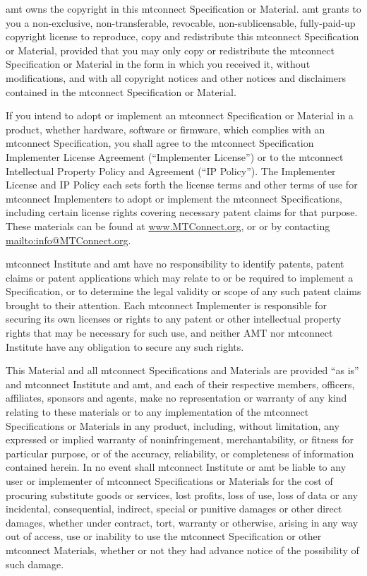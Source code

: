\gls{amt} owns the copyright in this \gls{mtconnect} Specification or Material. \gls{amt} grants to you a non-exclusive, non-transferable, revocable, non-sublicensable, fully-paid-up copyright license to reproduce, copy and redistribute this \gls{mtconnect} Specification or Material, provided that you may only copy or redistribute the \gls{mtconnect} Specification or Material in the form in which you received it, without modifications, and with all copyright notices and other notices and disclaimers contained in the \gls{mtconnect} Specification or Material.

If you intend to adopt or implement an \gls{mtconnect} Specification or Material in a product, whether hardware, software or firmware, which complies with an \gls{mtconnect} Specification, you shall agree to the \gls{mtconnect} Specification Implementer License Agreement (``Implementer License'') or to the \gls{mtconnect} Intellectual Property Policy and Agreement (``IP Policy''). The Implementer License and IP Policy each sets forth the license terms and other terms of use for \gls{mtconnect} Implementers to adopt or implement the \gls{mtconnect} Specifications, including certain license rights covering necessary patent claims for that purpose. These materials can be found at \url{www.MTConnect.org}, or or by contacting \url{mailto:info@MTConnect.org}. 

\gls{mtconnect} Institute and \gls{amt} have no responsibility to identify patents, patent claims or patent applications which may relate to or be required to implement a Specification, or to determine the legal validity or scope of any such patent claims brought to their attention. Each \gls{mtconnect} Implementer is responsible for securing its own licenses or rights to any patent or other intellectual property rights that may be necessary for such use, and neither AMT nor \gls{mtconnect} Institute have any obligation to secure any such rights.

This Material and all \gls{mtconnect} Specifications and Materials are provided ``as is'' and \gls{mtconnect} Institute and \gls{amt}, and each of their respective members, officers, affiliates, sponsors and agents, make no representation or warranty of any kind relating to these materials or to any implementation of the \gls{mtconnect} Specifications or Materials in any product, including, without limitation, any expressed or implied warranty of noninfringement, merchantability, or fitness for particular purpose, or of the accuracy, reliability, or completeness of information contained herein. In no event shall \gls{mtconnect} Institute or \gls{amt} be liable to any user or implementer of \gls{mtconnect} Specifications or Materials for the cost of procuring substitute goods or services, lost profits, loss of use, loss of data or any incidental, consequential, indirect, special or punitive damages or other direct damages, whether under contract, tort, warranty or otherwise, arising in any way out of access, use or inability to use the \gls{mtconnect} Specification or other \gls{mtconnect} Materials, whether or not they had advance notice of the possibility of such damage.
